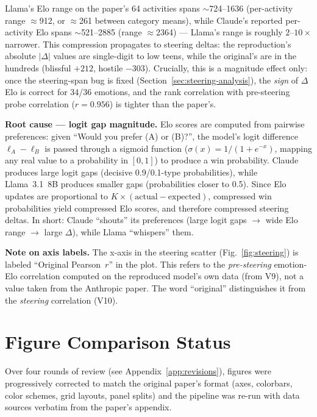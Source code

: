 \documentclass[11pt,a4paper]{article}
\begin{document}
Llama's Elo range on the paper's 64 activities spans $\sim$724--1636
(per-activity range $\approx$912, or $\approx$261 between category
means), while Claude's reported per-activity Elo spans
$\sim$521--2885 (range $\approx$2364) --- Llama's range is roughly
$2$--$10\times$ narrower.  This compression propagates to steering
deltas: the reproduction's absolute $|\Delta|$ values are single-digit
to low teens, while the original's are in the hundreds (blissful
$+212$, hostile $-303$).  Crucially, this is a magnitude effect only:
once the steering-span bug is fixed (Section~\ref{sec:steering-analysis}),
the \emph{sign} of $\Delta$Elo is correct for 34/36 emotions, and the
rank correlation with pre-steering probe correlation ($r{=}0.956$) is
tighter than the paper's.

\textbf{Root cause --- logit gap magnitude.}
Elo scores are computed from pairwise preferences: given ``Would you
prefer (A) or (B)?'', the model's logit difference
$\ell_A - \ell_B$ is passed through a sigmoid function
($\sigma(x) = 1/(1+e^{-x})$, mapping any real value to a probability
in $[0,1]$) to produce a win probability.  Claude produces large
logit gaps (decisive 0.9/0.1-type probabilities), while Llama~3.1~8B
produces smaller gaps (probabilities closer to 0.5).  Since Elo
updates are proportional to $K \times (\text{actual} -
\text{expected})$, compressed win probabilities yield compressed Elo
scores, and therefore compressed steering deltas.  In short: Claude
``shouts'' its preferences (large logit gaps $\rightarrow$ wide Elo
range $\rightarrow$ large $\Delta$), while Llama ``whispers'' them.

\textbf{Note on axis labels.}
The x-axis in the steering scatter (Fig.~\ref{fig:steering}) is
labeled ``Original Pearson~$r$'' in the plot.  This refers to the
\emph{pre-steering} emotion-Elo correlation computed on the reproduced
model's own data (from V9), not a value taken from the Anthropic
paper.  The word ``original'' distinguishes it from the
\emph{steering} correlation (V10).

\section{Figure Comparison Status}

Over four rounds of review (see Appendix~\ref{app:revisions}), figures
were progressively corrected to match the original paper's format
(axes, colorbars, color schemes, grid layouts, panel splits) and the
pipeline was re-run with data sources verbatim from the paper's
appendix.
\end{document}
